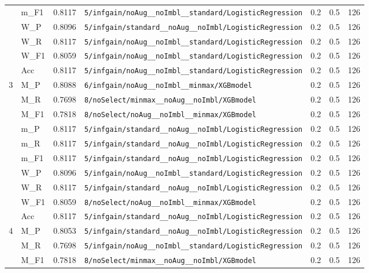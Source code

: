 \begin{table}[htbp]
\begin{tabular}{|c|l|c|>{\ttfamily\footnotesize}p{7.2cm}|c|c|c|}
 & m\_F1 & 0.8117 & \texttt{5/infgain/noAug\_\_noImbl\_\_standard/LogisticRegression} & 0.2 & 0.5  & 126 \\ 
 & W\_P & 0.8096 & \texttt{5/infgain/standard\_\_noAug\_\_noImbl/LogisticRegression} & 0.2 & 0.5  & 126 \\ 
 & W\_R & 0.8117 & \texttt{5/infgain/noAug\_\_noImbl\_\_standard/LogisticRegression} & 0.2 & 0.5  & 126 \\ 
 & W\_F1 & 0.8059 & \texttt{5/infgain/noAug\_\_noImbl\_\_standard/LogisticRegression} & 0.2 & 0.5  & 126 \\ 
 & Acc & 0.8117 & \texttt{5/infgain/noAug\_\_noImbl\_\_standard/LogisticRegression} & 0.2 & 0.5  & 126 \\ 
\hline
\multirow{10}{*}{3} & M\_P & 0.8088 & \texttt{6/infgain/noAug\_\_noImbl\_\_minmax/XGBmodel} & 0.2 & 0.5  & 126 \\ 
 & M\_R & 0.7698 & \texttt{8/noSelect/minmax\_\_noAug\_\_noImbl/XGBmodel} & 0.2 & 0.5  & 126 \\ 
 & M\_F1 & 0.7818 & \texttt{8/noSelect/noAug\_\_noImbl\_\_minmax/XGBmodel} & 0.2 & 0.5  & 126 \\ 
 & m\_P & 0.8117 & \texttt{5/infgain/standard\_\_noAug\_\_noImbl/LogisticRegression} & 0.2 & 0.5  & 126 \\ 
 & m\_R & 0.8117 & \texttt{5/infgain/standard\_\_noAug\_\_noImbl/LogisticRegression} & 0.2 & 0.5  & 126 \\ 
 & m\_F1 & 0.8117 & \texttt{5/infgain/standard\_\_noAug\_\_noImbl/LogisticRegression} & 0.2 & 0.5  & 126 \\ 
 & W\_P & 0.8096 & \texttt{5/infgain/noAug\_\_noImbl\_\_standard/LogisticRegression} & 0.2 & 0.5  & 126 \\ 
 & W\_R & 0.8117 & \texttt{5/infgain/standard\_\_noAug\_\_noImbl/LogisticRegression} & 0.2 & 0.5  & 126 \\ 
 & W\_F1 & 0.8059 & \texttt{8/noSelect/noAug\_\_noImbl\_\_minmax/XGBmodel} & 0.2 & 0.5  & 126 \\ 
 & Acc & 0.8117 & \texttt{5/infgain/standard\_\_noAug\_\_noImbl/LogisticRegression} & 0.2 & 0.5  & 126 \\ 
\hline
\multirow{10}{*}{4} & M\_P & 0.8053 & \texttt{5/infgain/standard\_\_noAug\_\_noImbl/LogisticRegression} & 0.2 & 0.5  & 126 \\ 
 & M\_R & 0.7698 & \texttt{5/infgain/noAug\_\_noImbl\_\_standard/LogisticRegression} & 0.2 & 0.5  & 126 \\ 
 & M\_F1 & 0.7818 & \texttt{8/noSelect/minmax\_\_noAug\_\_noImbl/XGBmodel} & 0.2 & 0.5  & 126 \\ 

\end{tabular}
\end{table}
